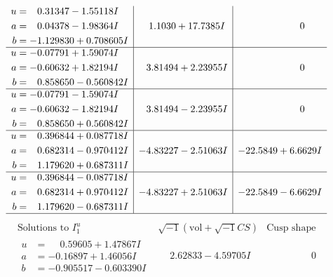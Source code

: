 \documentclass[1p]{elsarticle_modified}
\theoremstyle{definition}
\newcommand{\I}{\sqrt{-1}}
\begin{document}
$$\begin{array}{c|c|c}
\begin{aligned}
u &= \phantom{-}0.31347 - 1.55118 I \\
a &= \phantom{-}0.04378 - 1.98364 I \\
b &= -1.129830 + 0.708605 I\end{aligned}
 & \phantom{-}1.1030 + 17.7385 I & \phantom{-0.000000 } 0 \\ \hline\begin{aligned}
u &= -0.07791 + 1.59074 I \\
a &= -0.60632 + 1.82194 I \\
b &= \phantom{-}0.858650 - 0.560842 I\end{aligned}
 & \phantom{-}3.81494 + 2.23955 I & \phantom{-0.000000 } 0 \\ \hline\begin{aligned}
u &= -0.07791 - 1.59074 I \\
a &= -0.60632 - 1.82194 I \\
b &= \phantom{-}0.858650 + 0.560842 I\end{aligned}
 & \phantom{-}3.81494 - 2.23955 I & \phantom{-0.000000 } 0 \\ \hline\begin{aligned}
u &= \phantom{-}0.396844 + 0.087718 I \\
a &= \phantom{-}0.682314 - 0.970412 I \\
b &= \phantom{-}1.179620 + 0.687311 I\end{aligned}
 & -4.83227 - 2.51063 I & -22.5849 + 6.6629 I \\ \hline\begin{aligned}
u &= \phantom{-}0.396844 - 0.087718 I \\
a &= \phantom{-}0.682314 + 0.970412 I \\
b &= \phantom{-}1.179620 - 0.687311 I\end{aligned}
 & -4.83227 + 2.51063 I & -22.5849 - 6.6629 I\\
 \hline 
 \end{array}$$\newpage$$\begin{array}{c|c|c}  
\text{Solutions to }I^u_{1}& \I (\text{vol} + \sqrt{-1}CS) & \text{Cusp shape}\\
 \hline 
\begin{aligned}
u &= \phantom{-}0.59605 + 1.47867 I \\
a &= -0.16897 + 1.46056 I \\
b &= -0.905517 - 0.603390 I\end{aligned}
 & \phantom{-}2.62833 - 4.59705 I & \phantom{-0.000000 } 0 \\ \hline\begin{aligned}

\end{aligned}
\end{array}$$
\end{document}
